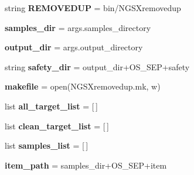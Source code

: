 \begin{DoxyCompactItemize}
\item 
string {\bfseries R\+E\+M\+O\+V\+E\+D\+UP} = \textquotesingle{}bin/N\+G\+S\+Xremovedup\textquotesingle{}\hypertarget{namespaceNGSXremovedup_a71c8f603780df46d54bf5b02a5162519}{}\label{namespaceNGSXremovedup_a71c8f603780df46d54bf5b02a5162519}

\item 
{\bfseries samples\+\_\+dir} = args.\+samples\+\_\+directory\hypertarget{namespaceNGSXremovedup_ae272202071fef71236a839f2e5612312}{}\label{namespaceNGSXremovedup_ae272202071fef71236a839f2e5612312}

\item 
{\bfseries output\+\_\+dir} = args.\+output\+\_\+directory\hypertarget{namespaceNGSXremovedup_a00c41f8f34aa3b9afa5f6387d27e4e60}{}\label{namespaceNGSXremovedup_a00c41f8f34aa3b9afa5f6387d27e4e60}

\item 
string {\bfseries safety\+\_\+dir} = output\+\_\+dir+O\+S\+\_\+\+S\+EP+\textquotesingle{}safety\textquotesingle{}\hypertarget{namespaceNGSXremovedup_a7be11692a0283b8e41a0c64da6098a83}{}\label{namespaceNGSXremovedup_a7be11692a0283b8e41a0c64da6098a83}

\item 
{\bfseries makefile} = open(\textquotesingle{}N\+G\+S\+Xremovedup.\+mk\textquotesingle{}, \textquotesingle{}w\textquotesingle{})\hypertarget{namespaceNGSXremovedup_afca0cf496794de7f111ce2b79cd71fa7}{}\label{namespaceNGSXremovedup_afca0cf496794de7f111ce2b79cd71fa7}

\item 
list {\bfseries all\+\_\+target\+\_\+list} = \mbox{[}$\,$\mbox{]}\hypertarget{namespaceNGSXremovedup_afcc2e6373814e1758a1f2ad90a94903a}{}\label{namespaceNGSXremovedup_afcc2e6373814e1758a1f2ad90a94903a}

\item 
list {\bfseries clean\+\_\+target\+\_\+list} = \mbox{[}$\,$\mbox{]}\hypertarget{namespaceNGSXremovedup_a799a9486dc19ac3a207ead93b97e0b71}{}\label{namespaceNGSXremovedup_a799a9486dc19ac3a207ead93b97e0b71}

\item 
list {\bfseries samples\+\_\+list} = \mbox{[}$\,$\mbox{]}\hypertarget{namespaceNGSXremovedup_a0932250404d205de77437edf115b7392}{}\label{namespaceNGSXremovedup_a0932250404d205de77437edf115b7392}

\item 
{\bfseries item\+\_\+path} = samples\+\_\+dir+O\+S\+\_\+\+S\+EP+item\hypertarget{namespaceNGSXremovedup_a12c92a07428504151ef152c5d15b7ed8}{}\label{namespaceNGSXremovedup_a12c92a07428504151ef152c5d15b7ed8}


\end{DoxyCompactItemize}
